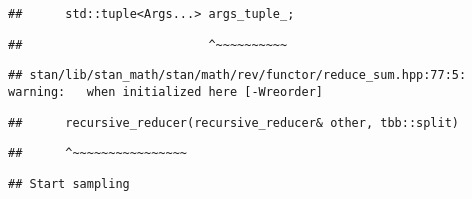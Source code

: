 \documentclass[
]{article}
\begin{document}
\begin{verbatim}
##      std::tuple<Args...> args_tuple_;
\end{verbatim}

\begin{verbatim}
##                          ^~~~~~~~~~~
\end{verbatim}

\begin{verbatim}
## stan/lib/stan_math/stan/math/rev/functor/reduce_sum.hpp:77:5: warning:   when initialized here [-Wreorder]
\end{verbatim}

\begin{verbatim}
##      recursive_reducer(recursive_reducer& other, tbb::split)
\end{verbatim}

\begin{verbatim}
##      ^~~~~~~~~~~~~~~~~
\end{verbatim}

\begin{verbatim}
## Start sampling
\end{verbatim}
\end{document}
